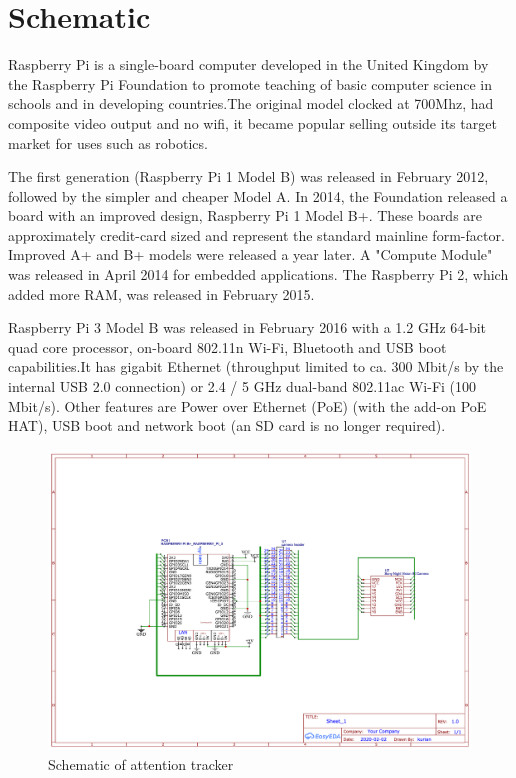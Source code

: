 \section{Schematic}

Raspberry Pi is a single-board computer developed in the United Kingdom by the Raspberry Pi Foundation to promote teaching of basic computer science in schools and in developing countries.The original model clocked at 700Mhz, had composite video output and no wifi, it became popular selling outside its target market for uses such as robotics. 

The first generation (Raspberry Pi 1 Model B) was released in February 2012, followed by the simpler and cheaper Model A. In 2014, the Foundation released a board with an improved design, Raspberry Pi 1 Model B+. These boards are approximately credit-card sized and represent the standard mainline form-factor. Improved A+ and B+ models were released a year later. A "Compute Module" was released in April 2014 for embedded applications. The Raspberry Pi 2, which added more RAM, was released in February 2015.

Raspberry Pi 3 Model B was released in February 2016 with a 1.2 GHz 64-bit quad core processor, on-board 802.11n Wi-Fi, Bluetooth and USB boot capabilities.It has gigabit Ethernet (throughput limited to ca. 300 Mbit/s by the internal USB 2.0 connection) or 2.4 / 5 GHz dual-band 802.11ac Wi-Fi (100 Mbit/s). Other features are Power over Ethernet (PoE) (with the add-on PoE HAT), USB boot and network boot (an SD card is no longer required).
\begin{figure}[ht]
\centering
\includegraphics[scale=0.15]{project}
\caption{Schematic of attention tracker}
\end{figure}
